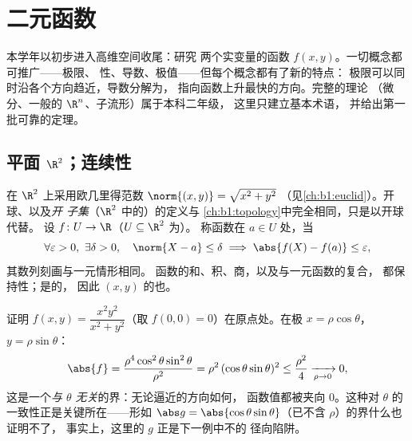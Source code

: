 \chapter{二元函数}\label{ch:b1:multivar}

本学年以初步进入高维空间收尾：研究
两个实变量的函数 $f(x, y)$。一切概念都可推广——极限、
性、导数、极值——但每个概念都有了新的特点：
极限可以同时沿各个方向趋近，导数分解为，
指向函数上升最快的方向。完整的理论
（微分、一般的 $\R^n$、子流形）属于本科二年级，
这里只建立基本术语，
并给出第一批可靠的定理。

\section{平面 $\R^2$；连续性}

\begin{definition}\label{def:b1:multivar:topology}
在 $\R^2$ 上采用欧几里得范数 $\norm{(x,y)} = \sqrt{x^2 + y^2}$
（见\cref{ch:b1:euclid}）。开球、以及\emph{开
子集}（$\R^2$ 中的）的定义与
\cref{ch:b1:topology}中完全相同，只是以开球代替。
设 $f \colon U \to \R$（$U \subseteq \R^2$ 为）。
称函数在 $a \in U$ 处\emph{}，当
\[
\forall\varepsilon > 0,\ \exists\delta > 0, \quad
\norm{X - a} \leq \delta \implies \abs{f(X) - f(a)} \leq
\varepsilon,
\]
其数列刻画与一元情形相同。
函数的和、积、商，以及与一元函数的复合，
都保持性；是的，
因此 $(x,y)$ 的也。
\end{definition}

\begin{example}
\label{ex:b1:multivar:polarbound}
证明 $f(x, y) = \dfrac{x^2y^2}{x^2 + y^2}$（取 $f(0,0) =
0$）在原点处。在极 $x =
\rho\cos\theta$，$y = \rho\sin\theta$：
\[
\abs{f} = \frac{\rho^4\cos^2\theta\sin^2\theta}{\rho^2}
= \rho^2\,(\cos\theta\sin\theta)^2 \leq \frac{\rho^2}{4}
\xrightarrow[\rho \to 0]{} 0 ,
\]
这是一个\emph{与 $\theta$ 无关}的界：无论逼近的方向如何，
函数值都被夹向 $0$。这种对
$\theta$ 的一致性正是关键所在——形如 $\abs g =
\abs{\cos\theta\sin\theta}$（已不含 $\rho$）的界什么也证明不了，
事实上，这里的 $g$ 正是下一例中不的
径向陷阱。
\end{example}


